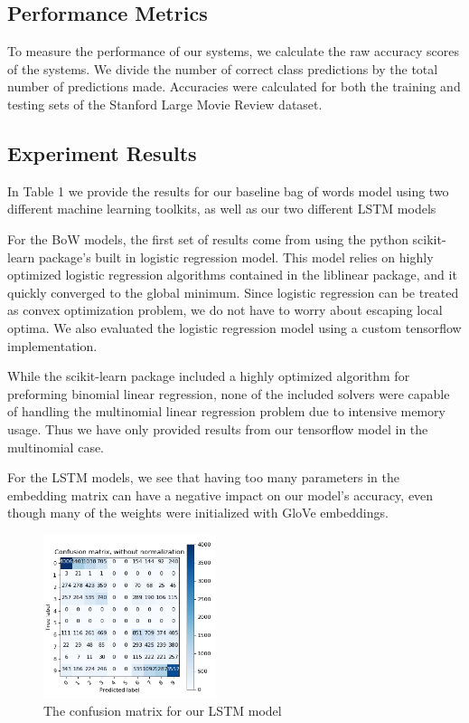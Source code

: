 \documentclass[conference]{IEEEtran}
\begin{document}
\subsection{Performance Metrics}
    To measure the performance of our systems, we calculate the raw accuracy
    scores of the systems. We divide the number of correct class predictions
    by the total number of predictions made. Accuracies were calculated
    for both the training and testing sets of the Stanford Large Movie Review dataset.

\subsection{Experiment Results}
    In Table 1 we provide the results for our baseline bag of words model using
    two different machine learning toolkits, as well as our two different LSTM models

    For the BoW models, the first set of results come from
    using the python scikit-learn package's built in logistic regression model.
    This model relies on highly optimized logistic regression algorithms
    contained in the liblinear \cite{Fan:2008:LLL:1390681.1442794} package,
    and it quickly converged to the global minimum. Since logistic regression
    can be treated as convex optimization problem, we do not have to worry
    about escaping local optima. We also evaluated the logistic regression
    model using a custom tensorflow implementation.

    While the scikit-learn package included a highly optimized algorithm for
    preforming binomial linear regression, none of the included solvers were
    capable of handling the multinomial linear regression problem due to intensive
    memory usage. Thus we have only provided results from our tensorflow
    model in the multinomial case.

    For the LSTM models, we see that having too many parameters in the
    embedding matrix can have a negative impact on our model's accuracy,
    even though many of the weights were initialized with GloVe embeddings.

    \begin{figure}
        \includegraphics[width=0.45\textwidth]{figure/conf_matrix}
        \caption{The confusion matrix for our LSTM model}
    \end{figure}
\end{document}
